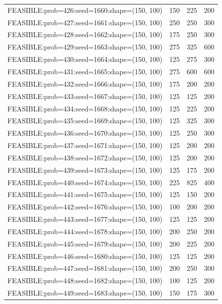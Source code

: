 \begin{longtable}{lccc}
FEASIBLE:prob=426:seed=1660:shape=(150, 100) &  150 &   225 &    200 \\
FEASIBLE:prob=427:seed=1661:shape=(150, 100) &  250 &   250 &    300 \\
FEASIBLE:prob=428:seed=1662:shape=(150, 100) &  175 &   250 &    300 \\
FEASIBLE:prob=429:seed=1663:shape=(150, 100) &  275 &   325 &    600 \\
FEASIBLE:prob=430:seed=1664:shape=(150, 100) &  125 &   275 &    300 \\
FEASIBLE:prob=431:seed=1665:shape=(150, 100) &  275 &   600 &    600 \\
FEASIBLE:prob=432:seed=1666:shape=(150, 100) &  175 &   200 &    200 \\
FEASIBLE:prob=433:seed=1667:shape=(150, 100) &  125 &   125 &    200 \\
FEASIBLE:prob=434:seed=1668:shape=(150, 100) &  125 &   225 &    200 \\
FEASIBLE:prob=435:seed=1669:shape=(150, 100) &  125 &   325 &    300 \\
FEASIBLE:prob=436:seed=1670:shape=(150, 100) &  125 &   250 &    300 \\
FEASIBLE:prob=437:seed=1671:shape=(150, 100) &  125 &   200 &    200 \\
FEASIBLE:prob=438:seed=1672:shape=(150, 100) &  125 &   200 &    200 \\
FEASIBLE:prob=439:seed=1673:shape=(150, 100) &  125 &   175 &    200 \\
FEASIBLE:prob=440:seed=1674:shape=(150, 100) &  225 &   825 &    400 \\
FEASIBLE:prob=441:seed=1675:shape=(150, 100) &  125 &   150 &    200 \\
FEASIBLE:prob=442:seed=1676:shape=(150, 100) &  100 &   200 &    200 \\
FEASIBLE:prob=443:seed=1677:shape=(150, 100) &  125 &   125 &    200 \\
FEASIBLE:prob=444:seed=1678:shape=(150, 100) &  200 &   250 &    200 \\
FEASIBLE:prob=445:seed=1679:shape=(150, 100) &  200 &   225 &    200 \\
FEASIBLE:prob=446:seed=1680:shape=(150, 100) &  125 &   125 &    200 \\
FEASIBLE:prob=447:seed=1681:shape=(150, 100) &  200 &   250 &    300 \\
FEASIBLE:prob=448:seed=1682:shape=(150, 100) &  100 &   125 &    200 \\
FEASIBLE:prob=449:seed=1683:shape=(150, 100) &  150 &   175 &    300 \\

\end{longtable}
